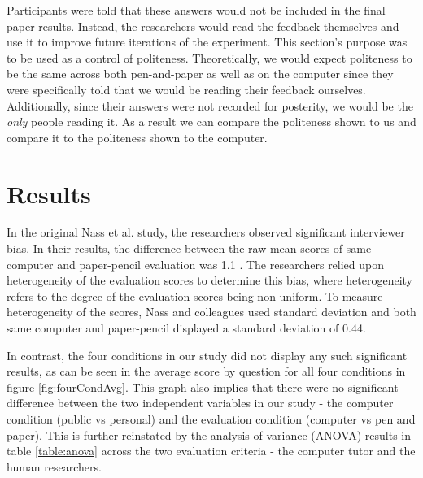 \documentclass{sig-alternate-05-2015}
\begin{document}
Participants were told that these answers would not be included in the final paper results.  Instead, the researchers would read the feedback themselves and use it to improve future iterations of the experiment.  This section's purpose was to be used as a control of politeness.  Theoretically, we would expect politeness to be the same across both pen-and-paper as well as on the computer since they were specifically told that we would be reading their feedback ourselves.  Additionally, since their answers were not recorded for posterity, we would be the \textit{only} people reading it.  As a result we can compare the politeness shown to us and compare it to the politeness shown to the computer.

 
\section{Results}

In the original Nass et al. study, the researchers observed significant interviewer bias. In their results, the difference between the raw mean scores of same computer and paper-pencil evaluation was 1.1 \cite{nass1999people}. The researchers relied upon heterogeneity of the evaluation scores to determine this bias, where heterogeneity refers to the degree of the evaluation scores being non-uniform. To measure heterogeneity of the scores, Nass and colleagues used standard deviation and both same computer and paper-pencil displayed a standard deviation of 0.44.

In contrast, the four conditions in our study did not display any such significant results, as can be seen in the average score by question for all four conditions in figure \ref{fig:fourCondAvg}. This graph also implies that there were no significant difference between the two independent variables in our study - the computer condition (public vs personal) and the evaluation condition (computer vs pen and paper). This is further reinstated by the analysis of variance (ANOVA) results in table \ref{table:anova} across the two evaluation criteria - the computer tutor and the human researchers.
\end{document}
